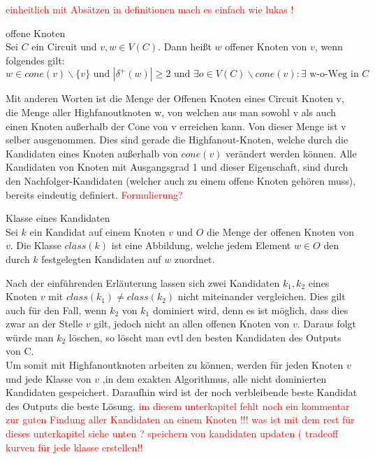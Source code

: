 \documentclass[11pt, a4paper, german]{article}
\begin{document}
\textcolor{red}{einheitlich mit Absätzen in definitionen mach es einfach wie lukas !}

\begin{definition}{offene Knoten}\\
	Sei $C$ ein Circuit und $v,w \in V(C)$. Dann heißt $w$ offener Knoten von $v$, wenn folgendes gilt: 
	\[ w \in cone(v)\backslash \{ v \} \text{ und } | \delta ^{+}(w)| \geq 2 \text{ und } \exists o \in V(C) \backslash cone(v) : \exists \text{ w-o-Weg in } C \] 	
\end{definition}
Mit anderen Worten ist die Menge der Offenen Knoten eines Circuit Knoten v, die Menge aller Highfanoutknoten w, von welchen aus man sowohl v als auch einen Knoten außerhalb der Cone von v erreichen kann. Von dieser Menge ist v selber ausgenommen. Dies sind gerade die Highfanout-Knoten, welche durch die Kandidaten eines Knoten außerhalb von $cone(v)$ verändert werden können. Alle Kandidaten von  Knoten mit Ausgangsgrad 1 und dieser Eigenschaft, sind durch den Nachfolger-Kandidaten (welcher auch zu einem offene Knoten gehören muss), bereits eindeutig definiert. \textcolor{red}{Formulierung?} \\

\begin{definition}{Klasse eines Kandidaten}\\
	Sei $k$ ein Kandidat auf einem Knoten $v$ und $O$ die Menge der offenen Knoten von $v$. Die Klasse $class(k)$ ist eine Abbildung, welche jedem Element $w \in O$ den durch $k$ festgelegten Kandidaten auf $w$ zuordnet.\\
\end{definition}
Nach der einführenden Erläuterung lassen sich zwei Kandidaten $k_1,k_2$ eines Knoten $v$ mit $class(k_1) \neq class(k_2)$ nicht miteinander vergleichen. Dies gilt auch für den Fall, wenn $k_2$ von  $k_1$ dominiert wird, denn es ist möglich, dass dies zwar an der Stelle $v$ gilt, jedoch nicht an allen offenen Knoten von $v$. Daraus folgt würde man $k_2$ löschen, so löscht man evtl den besten Kandidaten des Outputs von C. \\
Um somit mit Highfanoutknoten arbeiten zu können, werden für jeden Knoten $v$ und jede Klasse von $v$ ,in dem exakten Algorithmus, alle nicht dominierten Kandidaten gespeichert. Daraufhin wird ist der noch verbleibende beste Kandidat des Outputs die beste Lösung.
\textcolor{red}{im diesem unterkapitel fehlt noch ein kommentar zur guten Findung aller Kandidaten an einem Knoten !!!}
\textcolor{red}{was ist mit dem rest für dieses unterkapitel siehe unten ?}
\textcolor{red}{speichern von kandidaten updaten ( tradeoff kurven für jede klasse erstellen!!}
\end{document}
